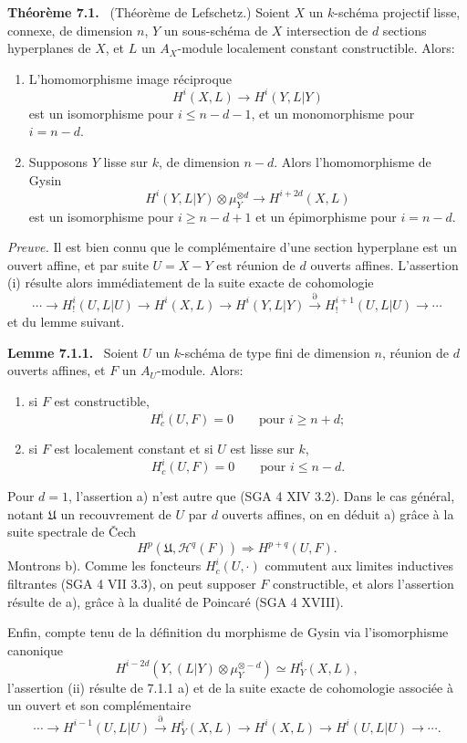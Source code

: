 \documentclass[11pt]{article}
\newenvironment{statement}[1]{\par\medskip\noindent\textbf{#1.}\ }{\par\medskip}
\begin{document}
\begin{statement}{Théorème 7.1}
(Théorème de Lefschetz.) Soient $X$ un $k$-schéma projectif lisse, connexe, de dimension $n$, $Y$ un sous-schéma de $X$ intersection de $d$ sections hyperplanes de $X$, et $L$ un $A_X$-module localement constant constructible. Alors:
\begin{enumerate}[label=(\roman*)]
\item L'homomorphisme image réciproque
\[
H^i(X,L)\to H^i(Y,L|Y)
\]
est un isomorphisme pour $i\le n-d-1$, et un monomorphisme pour $i=n-d$.
\item Supposons $Y$ lisse sur $k$, de dimension $n-d$. Alors l'homomorphisme de Gysin
\[
H^i(Y,L|Y)\otimes\mu_Y^{\otimes d}\to H^{i+2d}(X,L)
\]
est un isomorphisme pour $i\ge n-d+1$ et un épimorphisme pour $i=n-d$.
\end{enumerate}
\end{statement}

\emph{Preuve.} Il est bien connu que le complémentaire d'une section hyperplane est un ouvert affine, et par suite $U=X-Y$ est réunion de $d$ ouverts affines. L'assertion (i) résulte alors immédiatement de la suite exacte de cohomologie
\[
\cdots\to H_!^i(U,L|U)\to H^i(X,L)\to H^i(Y,L|Y)
\xrightarrow{\partial} H_!^{i+1}(U,L|U)\to\cdots
\]
et du lemme suivant.

\begin{statement}{Lemme 7.1.1}
Soient $U$ un $k$-schéma de type fini de dimension $n$, réunion de $d$ ouverts affines, et $F$ un $A_U$-module. Alors:
\begin{enumerate}[label=\alph*)]
\item si $F$ est constructible,
\[
H^i_c(U,F)=0\qquad\text{pour }i\ge n+d;
\]
\item si $F$ est localement constant et si $U$ est lisse sur $k$,
\[
H^i_c(U,F)=0\qquad\text{pour }i\le n-d.
\]
\end{enumerate}
\end{statement}

Pour $d=1$, l'assertion a) n'est autre que (SGA 4 XIV 3.2). Dans le cas général, notant $\mathfrak U$ un recouvrement de $U$ par $d$ ouverts affines, on en déduit a) grâce à la suite spectrale de Čech
\[
H^p(\mathfrak U,\mathcal H^q(F))\Rightarrow H^{p+q}(U,F).
\]
Montrons b). Comme les foncteurs $H_c^i(U,\cdot)$ commutent aux limites inductives filtrantes (SGA 4 VII 3.3), on peut supposer $F$ constructible, et alors l'assertion résulte de a), grâce à la dualité de Poincaré (SGA 4 XVIII).

Enfin, compte tenu de la définition du morphisme de Gysin via l'isomorphisme canonique
\[
H^{i-2d}(Y,(L|Y)\otimes\mu_Y^{\otimes -d})\simeq H^i_Y(X,L),
\tag{7.1.2}
\]
l'assertion (ii) résulte de 7.1.1 a) et de la suite exacte de cohomologie associée à un ouvert et son complémentaire
\[
\cdots\to H^{i-1}(U,L|U)\xrightarrow{\partial}H^i_Y(X,L)\to H^i(X,L)\to H^i(U,L|U)\to\cdots .
\]
\end{document}
